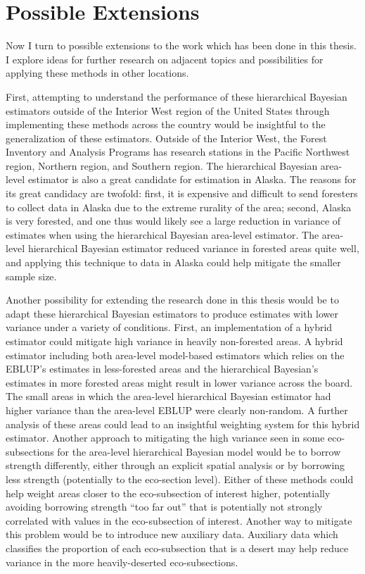 \documentclass[12pt,twoside]{reedthesis}
\begin{document}
\hypertarget{possible-extensions}{%
\section{Possible Extensions}\label{possible-extensions}}

Now I turn to possible extensions to the work which has been done in this thesis. I explore ideas for further research on adjacent topics and possibilities for applying these methods in other locations.

First, attempting to understand the performance of these hierarchical Bayesian estimators outside of the Interior West region of the United States through implementing these methods across the country would be insightful to the generalization of these estimators. Outside of the Interior West, the Forest Inventory and Analysis Programs has research stations in the Pacific Northwest region, Northern region, and Southern region. The hierarchical Bayesian area-level estimator is also a great candidate for estimation in Alaska. The reasons for its great candidacy are twofold: first, it is expensive and difficult to send foresters to collect data in Alaska due to the extreme rurality of the area; second, Alaska is very forested, and one thus would likely see a large reduction in variance of estimates when using the hierarchical Bayesian area-level estimator. The area-level hierarchical Bayesian estimator reduced variance in forested areas quite well, and applying this technique to data in Alaska could help mitigate the smaller sample size.

Another possibility for extending the research done in this thesis would be to adapt these hierarchical Bayesian estimators to produce estimates with lower variance under a variety of conditions. First, an implementation of a hybrid estimator could mitigate high variance in heavily non-forested areas. A hybrid estimator including both area-level model-based estimators which relies on the EBLUP's estimates in less-forested areas and the hierarchical Bayesian's estimates in more forested areas might result in lower variance across the board. The small areas in which the area-level hierarchical Bayesian estimator had higher variance than the area-level EBLUP were clearly non-random. A further analysis of these areas could lead to an insightful weighting system for this hybrid estimator. Another approach to mitigating the high variance seen in some eco-subsections for the area-level hierarchical Bayesian model would be to borrow strength differently, either through an explicit spatial analysis or by borrowing less strength (potentially to the eco-section level). Either of these methods could help weight areas closer to the eco-subsection of interest higher, potentially avoiding borrowing strength ``too far out'' that is potentially not strongly correlated with values in the eco-subsection of interest. Another way to mitigate this problem would be to introduce new auxiliary data. Auxiliary data which classifies the proportion of each eco-subsection that is a desert may help reduce variance in the more heavily-deserted eco-subsections.
\end{document}
